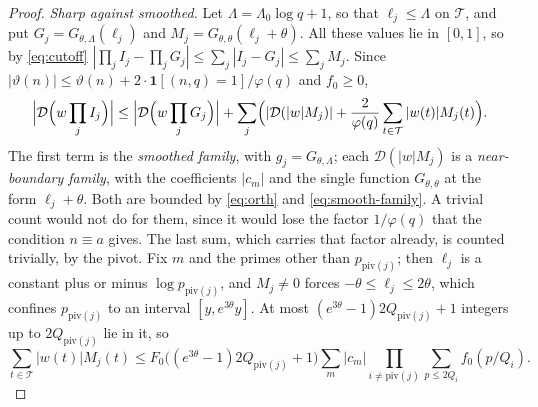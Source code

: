 \documentclass[11pt]{article}
\numberwithin{equation}{section}
\begin{document}
\begin{proof}
\emph{Sharp against smoothed.} Let $\Lambda = \Lambda_0 \log q + 1$, so that $\ell_j \le \Lambda$ on $\mathcal T$, and put
$G_j = G_{\theta, \Lambda}(\ell_j)$ and $M_j = G_{\theta, \theta}(\ell_j + \theta)$. All these values lie in $[0, 1]$,
so by \eqref{eq:cutoff} $|\prod_j I_j - \prod_j G_j| \le \sum_j |I_j - G_j| \le \sum_j M_j$. Since $|\vartheta(n)| \le
\vartheta(n) + 2 \cdot \mathbf 1[(n, q) = 1]/\varphi(q)$ and $f_0 \ge 0$,
\begin{equation}\label{eq:sharp-smooth}
  \Bigl|\mathcal D\Bigl(w \prod_j I_j\Bigr)\Bigr| \le \Bigl|\mathcal D\Bigl(w \prod_j G_j\Bigr)\Bigr|
  + \sum_j \Bigl(|\mathcal D(|w| M_j)| + \frac2{\varphi(q)} \sum_{t \in \mathcal T} |w(t)| M_j(t)\Bigr).
\end{equation}
The first term is the \emph{smoothed family}, with $g_j = G_{\theta, \Lambda}$; each $\mathcal D(|w| M_j)$ is a
\emph{near-boundary family}, with the coefficients $|c_m|$ and the single function $G_{\theta, \theta}$ at the form
$\ell_j + \theta$. Both are bounded by \eqref{eq:orth} and \eqref{eq:smooth-family}. A trivial count would not do for
them, since it would lose
the factor $1/\varphi(q)$ that the condition $n \equiv a$ gives. The last sum, which carries that factor already, is
counted trivially, by the pivot. Fix $m$ and the primes other than $p_{\mathrm{piv}(j)}$; then $\ell_j$ is a constant
plus or minus $\log p_{\mathrm{piv}(j)}$, and $M_j \ne 0$ forces $-\theta \le \ell_j \le 2\theta$, which confines
$p_{\mathrm{piv}(j)}$ to an interval $[y, e^{3\theta} y]$. At most $(e^{3\theta} - 1) 2Q_{\mathrm{piv}(j)} + 1$ integers
up to $2Q_{\mathrm{piv}(j)}$ lie in it, so
\[
  \sum_{t \in \mathcal T} |w(t)| M_j(t)
  \le F_0 \bigl((e^{3\theta} - 1) 2Q_{\mathrm{piv}(j)} + 1\bigr) \sum_m |c_m| \prod_{i \ne \mathrm{piv}(j)} \sum_{p \le
  2Q_i} f_0(p/Q_i).
\]


\end{proof}
\end{document}
